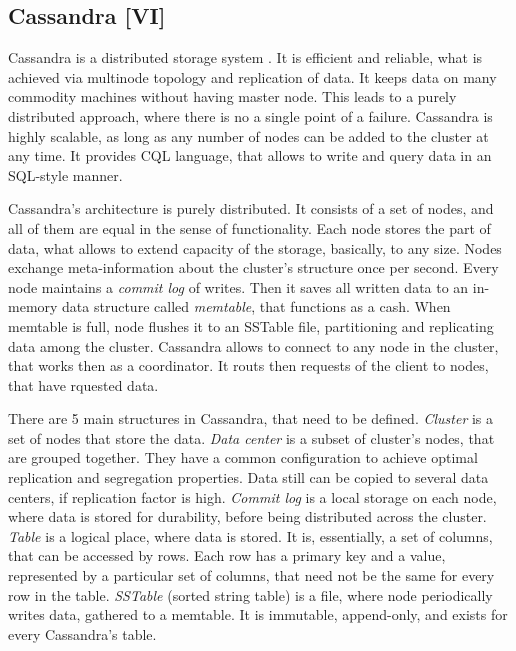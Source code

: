 \subsection{Cassandra [VI]}
\label{subs:cassandra}

Cassandra is a distributed storage system \cite{Cassandra, Avinash2014, Hewitt2011}.
It is efficient and reliable, what is achieved via multinode topology and replication of data.
It keeps data on many commodity machines without having master node.
This leads to a purely distributed approach, where there is no a single point of a failure.
Cassandra is highly scalable, as long as any number of nodes can be added to the cluster at any time.
It provides CQL language, that allows to write and query data in an SQL-style manner.

Cassandra's architecture is purely distributed.
It consists of a set of nodes, and all of them are equal in the sense of functionality.
Each node stores the part of data, what allows to extend capacity of the storage, basically, to any size.
Nodes exchange meta-information about the cluster's structure once per second.
Every node maintains a \textit{commit log} of writes.
Then it saves all written data to an in-memory data structure called \textit{memtable}, that functions as a cash.
When memtable is full, node flushes it to an SSTable file, partitioning and replicating data among the cluster.
Cassandra allows to connect to any node in the cluster, that works then as a coordinator.
It routs then requests of the client to nodes, that have rquested data.

There are 5 main structures in Cassandra, that need to be defined.
\textit{Cluster} is a set of nodes that store the data.
\textit{Data center} is a subset of cluster's nodes, that are grouped together.
They have a common configuration to achieve optimal replication and segregation properties.
Data still can be copied to several data centers, if replication factor is high.
\textit{Commit log} is a local storage on each node, where data is stored for durability, before being distributed across the cluster.
\textit{Table} is a logical place, where data is stored.
It is, essentially, a set of columns, that can be accessed by rows.
Each row has a primary key and a value, represented by a particular set of columns, that need not be the same for every row in the table.
\textit{SSTable} (sorted string table) is a file, where node periodically writes data, gathered to a memtable.
It is immutable, append-only, and exists for every Cassandra's table.


